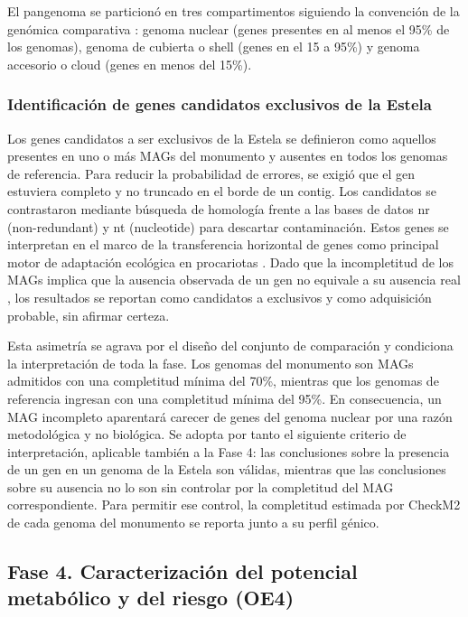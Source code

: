 El pangenoma se particionó en tres compartimentos siguiendo la convención de la genómica comparativa \cite{panaroo2020, tettelin2005, Page2015}: genoma nuclear (genes presentes en al menos el 95\% de los genomas), genoma de cubierta o shell (genes en el 15 a 95\%) y genoma accesorio o cloud (genes en menos del 15\%).

\subsubsection{Identificación de genes candidatos exclusivos de la Estela}

Los genes candidatos a ser exclusivos de la Estela se definieron como aquellos presentes en uno o más MAGs del monumento y ausentes en todos los genomas de referencia. Para reducir la probabilidad de errores, se exigió que el gen estuviera completo y no truncado en el borde de un contig. Los candidatos se contrastaron mediante búsqueda de homología frente a las bases de datos nr (non-redundant) y nt (nucleotide) para descartar contaminación. Estos genes se interpretan en el marco de la transferencia horizontal de genes como principal motor de adaptación ecológica en procariotas \cite{soucy2015}. Dado que la incompletitud de los MAGs implica que la ausencia observada de un gen no equivale a su ausencia real \cite{bowers2017}, los resultados se reportan como candidatos a exclusivos y como adquisición probable, sin afirmar certeza.

Esta asimetría se agrava por el diseño del conjunto de comparación y condiciona la interpretación de toda la fase. Los genomas del monumento son MAGs admitidos con una completitud mínima del 70\%, mientras que los genomas de referencia ingresan con una completitud mínima del 95\%. En consecuencia, un MAG incompleto aparentará carecer de genes del genoma nuclear por una razón metodológica y no biológica. Se adopta por tanto el siguiente criterio de interpretación, aplicable también a la Fase 4: las conclusiones sobre la presencia de un gen en un genoma de la Estela son válidas, mientras que las conclusiones sobre su ausencia no lo son sin controlar por la completitud del MAG correspondiente. Para permitir ese control, la completitud estimada por CheckM2 de cada genoma del monumento se reporta junto a su perfil génico.

\subsection{Fase 4. Caracterización del potencial metabólico y del riesgo (OE4)}

